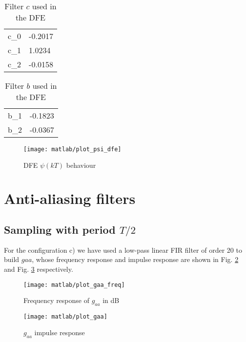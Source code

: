 \documentclass[a4paper,oneside]{article}
\begin{document}
\begin{table}
  \centering
\begin{tabular}{LL}
  c_0 & -0.2017 \\
  c_1 & 1.0234 \\
  c_2 & -0.0158
\end{tabular}
\caption{Filter $c$ used in the DFE}
\label{tab:c_dfe}
\end{table}
\begin{table}
  \centering
\begin{tabular}{LL}
  b_1 & -0.1823 \\
  b_2 & -0.0367
\end{tabular}
\caption{Filter $b$ used in the DFE}
\label{tab:b_dfe}
\end{table}

\begin{figure}[h]
  \centering
  \texttt{[image: matlab/plot\_psi\_dfe]}
  \caption{DFE $\psi(kT)$ behaviour}
  \label{plot:psi_dfe_1}
\end{figure}



\section{Anti-aliasing filters}

\subsection{Sampling with period $T/2$}
For the configuration c) we have used a low-pass linear FIR filter of order 20 to build $gaa$, whose frequency response and impulse response are shown in Fig. \ref{plot:Gaa2} and Fig. \ref{plot:gaa2} respectively. 
\begin{figure}[h]
  \centering
  \texttt{[image: matlab/plot\_gaa\_freq]}
  \caption{Frequency response of $g_{aa}$ in dB}
  \label{plot:Gaa2}
\end{figure}
\begin{figure}[h]
  \centering
  \texttt{[image: matlab/plot\_gaa]}
  \caption{$g_{aa}$ impulse response}
  \label{plot:gaa2}
\end{figure}

 
\end{document}
